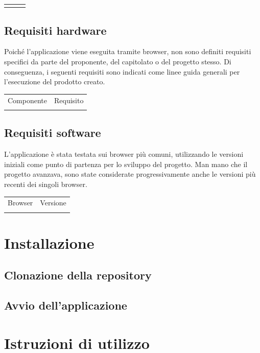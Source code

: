 \documentclass{article}
\begin{document}
{\begin{center}
\begin{tabular}{c|c|c}
\rowcolor{LightBlue}
\end{tabular}
\end{center}

\subsection{Requisiti hardware}
Poiché l'applicazione viene eseguita tramite browser, non sono definiti requisiti specifici da parte del proponente, del capitolato o del progetto stesso. Di conseguenza, i seguenti requisiti sono indicati come linee guida generali per l'esecuzione del prodotto creato.
\begin{center}
\begin{tabular}{c|c}
\hline
\rowcolor{Blue}
Componente & Requisito \\
\rowcolor{LighterBlue}

\rowcolor{LightBlue}
\end{tabular}
\end{center}

\subsection{Requisiti software}
L'applicazione è stata testata sui browser più comuni, utilizzando le versioni iniziali come punto di partenza per lo sviluppo del progetto. Man mano che il progetto avanzava, sono state considerate progressivamente anche le versioni più recenti dei singoli browser.
\begin{center}
\begin{tabular}{c|c}
\hline
\rowcolor{Blue}
Browser & Versione \\
\rowcolor{LighterBlue}

\rowcolor{LightBlue}
\end{tabular}
\end{center}

\section{Installazione}
\subsection{Clonazione della repository}
\subsection{Avvio dell'applicazione}

\section{Istruzioni di utilizzo}
}
\end{document}
